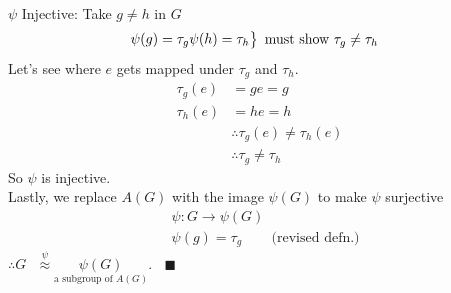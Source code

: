 \begin{theorem}
\begin{enumerate}
\begin{align}
\end{align}
$\psi$ Injective: Take $g\neq h $ in $G$
\begin{align}
    &\begin{rcases}
    \psi(g)=\tau_g
    \psi(h)=\tau_h
    \end{rcases} \text{ must show }\tau_g\neq \tau_h \nonumber
\end{align}
Let's see where $e$ gets mapped under $\tau_g$ and $\tau_h$.
\begin{align}
    \tau_g(e)&=ge=g \nonumber \\
    \tau_h(e)&=he=h \nonumber \\
    &\therefore \tau_g(e)\neq \tau_h(e) \nonumber \\
    &\therefore \tau_g \neq \tau_h \nonumber
\end{align}
So $\psi$ is injective. \\
Lastly, we replace $A(G)$ with the image $\psi(G)$ to make $\psi$ surjective
\begin{align}
    &\psi: G\rightarrow \psi(G) \nonumber \\
    &\psi(g)=\tau_g \ \ \ \ \ \ \ \ \text{ (revised defn.)} \nonumber
\end{align}
$\therefore G \ \ \ \overset{\psi}{\approx} \underset{\text{a subgroup of }A(G)}{\psi(G)}. \ \ \ \ \blacksquare$
\end{enumerate}

\end{theorem}

